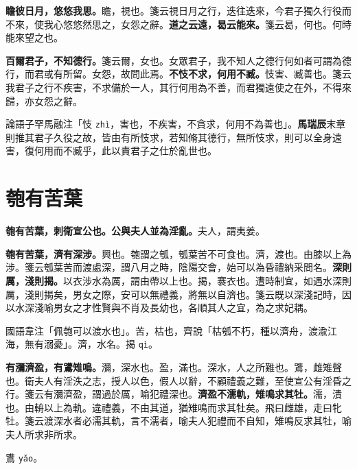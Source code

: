 \textbf{瞻彼日月，悠悠我思。}{\footnotesize 瞻，視也。箋云視日月之行，迭往迭來，今君子獨久行役而不來，使我心悠悠然思之，女怨之辭。}\textbf{道之云遠，曷云能來。}{\footnotesize 箋云曷，何也。何時能來望之也。}

\textbf{百爾君子，不知德行。}{\footnotesize 箋云爾，女也。女眾君子，我不知人之德行何如者可謂為德行，而君或有所留。女怨，故問此焉。}\textbf{不忮不求，何用不臧。}{\footnotesize 忮害、臧善也。箋云我君子之行不疾害，不求備於一人，其行何用為不善，而君獨遠使之在外，不得來歸，亦女怨之辭。}

\begin{quoting}論語子罕馬融注「忮 \texttt{zhì}，害也，不疾害，不貪求，何用不為善也」。\textbf{馬瑞辰}末章則推其君子久役之故，皆由有所忮求，若知脩其德行，無所忮求，則可以全身遠害，復何用而不臧乎，此以責君子之仕於亂世也。\end{quoting}

\section{匏有苦葉}


\textbf{匏有苦葉，刺衛宣公也。公與夫人並為淫亂。}{\footnotesize 夫人，謂夷姜。}

\textbf{匏有苦葉，濟有深涉。}{\footnotesize 興也。匏謂之瓠，瓠葉苦不可食也。濟，渡也。由膝以上為涉。箋云瓠葉苦而渡處深，謂八月之時，陰陽交會，始可以為昏禮納采問名。}\textbf{深則厲，淺則揭。}{\footnotesize 以衣涉水為厲，謂由帶以上也。揭，褰衣也。遭時制宜，如遇水深則厲，淺則揭矣，男女之際，安可以無禮義，將無以自濟也。箋云既以深淺記時，因以水深淺喻男女之才性賢與不肖及長幼也，各順其人之宜，為之求妃耦。}

\begin{quoting}國語韋注「佩匏可以渡水也」。苦，枯也，齊說「枯瓠不朽，種以濟舟，渡渝江海，無有溺憂」。濟，水名。揭 \texttt{qì}。\end{quoting}

\textbf{有瀰濟盈，有鷕雉鳴。}{\footnotesize 瀰，深水也。盈，滿也。深水，人之所難也。鷕，雌雉聲也。衛夫人有淫泆之志，授人以色，假人以辭，不顧禮義之難，至使宣公有淫昏之行。箋云有瀰濟盈，謂過於厲，喻犯禮深也。}\textbf{濟盈不濡軌，雉鳴求其牡。}{\footnotesize 濡，漬也。由輈以上為軌。違禮義，不由其道，猶雉鳴而求其牡矣。飛曰雌雄，走曰牝牡。箋云渡深水者必濡其軌，言不濡者，喻夫人犯禮而不自知，雉鳴反求其牡，喻夫人所求非所求。}

\begin{quoting}鷕 \texttt{yǎo}。\end{quoting}

